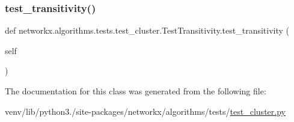 \subsubsection{\texorpdfstring{test\+\_\+transitivity()}{test\_transitivity()}}
{\footnotesize\ttfamily def networkx.\+algorithms.\+tests.\+test\+\_\+cluster.\+Test\+Transitivity.\+test\+\_\+transitivity (\begin{DoxyParamCaption}\item[{}]{self }\end{DoxyParamCaption})}



The documentation for this class was generated from the following file\+:\begin{DoxyCompactItemize}
\item 
venv/lib/python3./site-\/packages/networkx/algorithms/tests/\hyperlink{tests_2test__cluster_8py}{test\+\_\+cluster.\+py}\end{DoxyCompactItemize}
